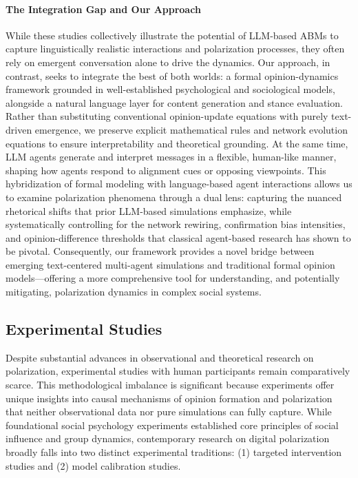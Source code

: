 \paragraph{The Integration Gap and Our Approach}
While these studies collectively illustrate the potential of LLM-based ABMs to capture linguistically realistic interactions and polarization processes, they often rely on emergent conversation alone to drive the dynamics. Our approach, in contrast, seeks to integrate the best of both worlds: a formal opinion-dynamics framework grounded in well-established psychological and sociological models, alongside a natural language layer for content generation and stance evaluation. Rather than substituting conventional opinion-update equations with purely text-driven emergence, we preserve explicit mathematical rules and network evolution equations to ensure interpretability and theoretical grounding. At the same time, LLM agents generate and interpret messages in a flexible, human-like manner, shaping how agents respond to alignment cues or opposing viewpoints. This hybridization of formal modeling with language-based agent interactions allows us to examine polarization phenomena through a dual lens: capturing the nuanced rhetorical shifts that prior LLM-based simulations emphasize, while systematically controlling for the network rewiring, confirmation bias intensities, and opinion-difference thresholds that classical agent-based research has shown to be pivotal. Consequently, our framework provides a novel bridge between emerging text-centered multi-agent simulations and traditional formal opinion models—offering a more comprehensive tool for understanding, and potentially mitigating, polarization dynamics in complex social systems.

\subsection{Experimental Studies}

Despite substantial advances in observational and theoretical research on polarization, experimental studies with human participants remain comparatively scarce. This methodological imbalance is significant because experiments offer unique insights into causal mechanisms of opinion formation and polarization that neither observational data nor pure simulations can fully capture. While foundational social psychology experiments established core principles of social influence and group dynamics, contemporary research on digital polarization broadly falls into two distinct experimental traditions: (1) targeted intervention studies and (2) model calibration studies.

